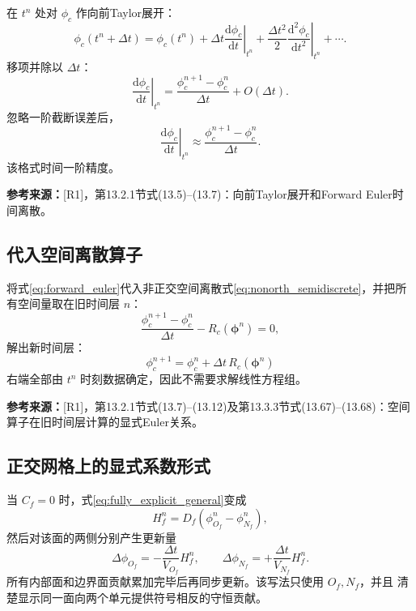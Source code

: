 \documentclass[UTF8,12pt,a4paper]{ctexart}
\numberwithin{equation}{section}
\newcommand{\Rone}{\textnormal{[R1]}}
\newcommand{\source}[1]{%
  \par\smallskip
  \noindent\colorbox{sourcebg}{%
    \parbox{0.955\linewidth}{\raggedright\footnotesize\color{sourcegray}\textbf{参考来源：}#1}%
  }
  \par\smallskip
}
\begin{document}
在 $t^n$ 处对 $\phi_c$ 作向前Taylor展开：
\begin{equation}
  \phi_c(t^n+\Delta t)
  =\phi_c(t^n)
  +\Delta t\left.\frac{\mathrm d\phi_c}{\mathrm dt}\right|_{t^n}
  +\frac{\Delta t^2}{2}
   \left.\frac{\mathrm d^2\phi_c}{\mathrm dt^2}\right|_{t^n}
  +\cdots.
  \label{eq:taylor_time}
\end{equation}
移项并除以 $\Delta t$：
\begin{equation}
  \left.\frac{\mathrm d\phi_c}{\mathrm dt}\right|_{t^n}
  =\frac{\phi_c^{n+1}-\phi_c^n}{\Delta t}
  +O(\Delta t).
  \label{eq:forward_difference}
\end{equation}
忽略一阶截断误差后，
\begin{equation}
  \boxed{
  \left.\frac{\mathrm d\phi_c}{\mathrm dt}\right|_{t^n}
  \approx\frac{\phi_c^{n+1}-\phi_c^n}{\Delta t}}.
  \label{eq:forward_euler}
\end{equation}
该格式时间一阶精度。

\source{\Rone，第13.2.1节式(13.5)--(13.7)：向前Taylor展开和Forward Euler时间离散。}

\subsection{代入空间离散算子}

将式\eqref{eq:forward_euler}代入非正交空间离散式\eqref{eq:nonorth_semidiscrete}，并把所有空间量取在旧时间层 $n$：
\begin{equation}
  \frac{\phi_c^{n+1}-\phi_c^n}{\Delta t}
  -R_c(\bm\phi^n)=0,
  \label{eq:fully_discrete_before_solve}
\end{equation}
解出新时间层：
\begin{equation}
  \boxed{
  \phi_c^{n+1}
  =\phi_c^n+\Delta t\,R_c(\bm\phi^n)}
  \label{eq:fully_explicit_general}
\end{equation}
右端全部由 $t^n$ 时刻数据确定，因此不需要求解线性方程组。

\source{\Rone，第13.2.1节式(13.7)--(13.12)及第13.3.3节式(13.67)--(13.68)：空间算子在旧时间层计算的显式Euler关系。}

\subsection{正交网格上的显式系数形式}

当 $C_f=0$ 时，式\eqref{eq:fully_explicit_general}变成
\begin{equation}
  H_f^n=D_f(\phi_{O_f}^n-\phi_{N_f}^n),
\end{equation}
然后对该面的两侧分别产生更新量
\begin{equation}
  \boxed{
  \Delta\phi_{O_f}
  =-\frac{\Delta t}{V_{O_f}}H_f^n,
  \qquad
  \Delta\phi_{N_f}
  =+\frac{\Delta t}{V_{N_f}}H_f^n.}
  \label{eq:explicit_coeff_form}
\end{equation}
所有内部面和边界面贡献累加完毕后再同步更新。该写法只使用 $O_f,N_f$，并且
清楚显示同一面向两个单元提供符号相反的守恒贡献。
\end{document}
